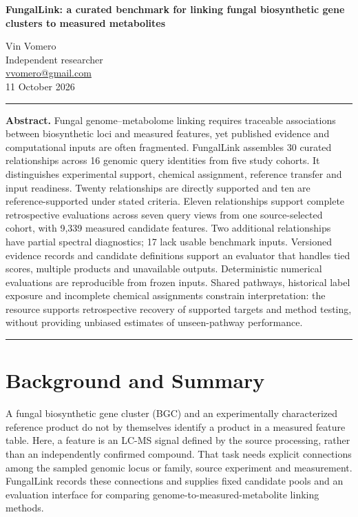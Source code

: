 \documentclass[
  10pt,
  a4paper,
]{article}
\author{}
\date{}
\begin{document}
\begin{center}
{\LARGE\bfseries\color{ink}FungalLink: a curated benchmark for linking fungal biosynthetic gene clusters to measured metabolites\par}
\vspace{10pt}
{\large Vin Vomero}\\[3pt]
Independent researcher\\[3pt]
\href{mailto:vvomero@gmail.com}{vvomero@gmail.com}\\[8pt]
{\small 11 October 2026}
\end{center}
\vspace{4pt}
\hrule
\vspace{8pt}
\begin{minipage}{\textwidth}\small\textbf{Abstract.} Fungal genome--metabolome linking requires traceable associations between biosynthetic loci and measured features, yet published evidence and computational inputs are often fragmented. FungalLink assembles 30 curated relationships across 16 genomic query identities from five study cohorts. It distinguishes experimental support, chemical assignment, reference transfer and input readiness. Twenty relationships are directly supported and ten are reference-supported under stated criteria. Eleven relationships support complete retrospective evaluations across seven query views from one source-selected cohort, with 9,339 measured candidate features. Two additional relationships have partial spectral diagnostics; 17 lack usable benchmark inputs. Versioned evidence records and candidate definitions support an evaluator that handles tied scores, multiple products and unavailable outputs. Deterministic numerical evaluations are reproducible from frozen inputs. Shared pathways, historical label exposure and incomplete chemical assignments constrain interpretation: the resource supports retrospective recovery of supported targets and method testing, without providing unbiased estimates of unseen-pathway performance.\par\end{minipage}
\vspace{9pt}
\hrule
\vspace{8pt}

\section{Background and Summary}\label{background-and-summary}

A fungal biosynthetic gene cluster (BGC) and an experimentally characterized reference product do not by themselves identify a product in a measured feature table. Here, a feature is an LC-MS signal defined by the source processing, rather than an independently confirmed compound. That task needs explicit connections among the sampled genomic locus or family, source experiment and measurement. FungalLink records these connections and supplies fixed candidate pools and an evaluation interface for comparing genome-to-measured-metabolite linking methods.
\end{document}
